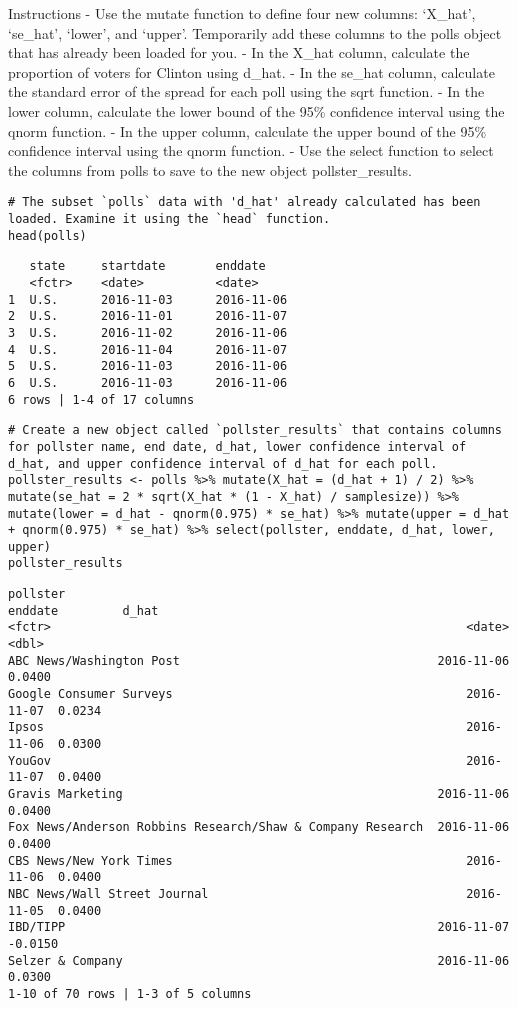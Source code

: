 \documentclass[
]{article}
\begin{document}
Instructions - Use the mutate function to define four new columns:
`X\_hat', `se\_hat', `lower', and `upper'. Temporarily add these columns
to the polls object that has already been loaded for you. - In the
X\_hat column, calculate the proportion of voters for Clinton using
d\_hat. - In the se\_hat column, calculate the standard error of the
spread for each poll using the sqrt function. - In the lower column,
calculate the lower bound of the 95\% confidence interval using the
qnorm function. - In the upper column, calculate the upper bound of the
95\% confidence interval using the qnorm function. - Use the select
function to select the columns from polls to save to the new object
pollster\_results.

\begin{verbatim}
# The subset `polls` data with 'd_hat' already calculated has been loaded. Examine it using the `head` function.
head(polls)
\end{verbatim}

\begin{verbatim}
   state     startdate       enddate
   <fctr>    <date>          <date>
1  U.S.      2016-11-03      2016-11-06 
2  U.S.      2016-11-01      2016-11-07 
3  U.S.      2016-11-02      2016-11-06 
4  U.S.      2016-11-04      2016-11-07 
5  U.S.      2016-11-03      2016-11-06 
6  U.S.      2016-11-03      2016-11-06 
6 rows | 1-4 of 17 columns
\end{verbatim}

\begin{verbatim}
# Create a new object called `pollster_results` that contains columns for pollster name, end date, d_hat, lower confidence interval of d_hat, and upper confidence interval of d_hat for each poll.
pollster_results <- polls %>% mutate(X_hat = (d_hat + 1) / 2) %>% mutate(se_hat = 2 * sqrt(X_hat * (1 - X_hat) / samplesize)) %>% mutate(lower = d_hat - qnorm(0.975) * se_hat) %>% mutate(upper = d_hat + qnorm(0.975) * se_hat) %>% select(pollster, enddate, d_hat, lower, upper)
pollster_results
\end{verbatim}

\begin{verbatim}
pollster                                                        enddate         d_hat
<fctr>                                                          <date>          <dbl>
ABC News/Washington Post                                    2016-11-06  0.0400  
Google Consumer Surveys                                         2016-11-07  0.0234  
Ipsos                                                           2016-11-06  0.0300  
YouGov                                                          2016-11-07  0.0400  
Gravis Marketing                                            2016-11-06  0.0400  
Fox News/Anderson Robbins Research/Shaw & Company Research  2016-11-06  0.0400  
CBS News/New York Times                                         2016-11-06  0.0400  
NBC News/Wall Street Journal                                    2016-11-05  0.0400  
IBD/TIPP                                                    2016-11-07     -0.0150  
Selzer & Company                                            2016-11-06  0.0300  
1-10 of 70 rows | 1-3 of 5 columns
\end{verbatim}
\end{document}
